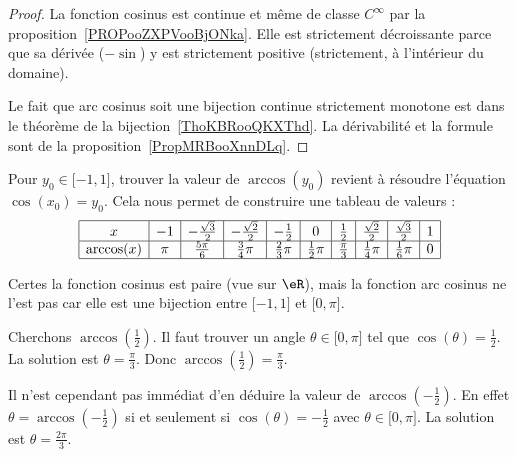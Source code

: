 \begin{proof}
	La fonction cosinus est continue et même de classe \(  C^{\infty}\) par la proposition~\ref{PROPooZXPVooBjONka}. Elle est strictement décroissante parce que sa dérivée (\( -\sin\)) y est strictement positive (strictement, à l'intérieur du domaine).

		Le fait que arc cosinus soit une bijection continue strictement monotone est dans le théorème de la bijection~\ref{ThoKBRooQKXThd}. La dérivabilité et la formule sont de la proposition~\ref{PropMRBooXnnDLq}.
	\end{proof}

	Pour \( y_0\in\mathopen[ -1 , 1 \mathclose]\), trouver la valeur de \( \arccos(y_0)\) revient à résoudre l'équation \( \cos(x_0)=y_0\). Cela nous permet de construire une tableau de valeurs :
	\begin{equation*}
		\begin{array}[]{|c|c|c|c|c|c|c|c|c|c|}
			\hline
			x          & -1  & -\frac{ \sqrt{3} }{2} & -\frac{ \sqrt{2} }{2} & -\frac{ 1 }{2}     & 0                & \frac{ 1 }{2}     & \frac{ \sqrt{2} }{2} & \frac{ \sqrt{3} }{2} & 1 \\
			\hline
			\arccos(x) & \pi & \frac{ 5\pi }{ 6 }    & \frac{ 3 }{ 4 }\pi    & \frac{ 2 }{ 3 }\pi & \frac{ 1 }{2}\pi & \frac{ \pi }{ 3 } & \frac{1}{ 4 }\pi     & \frac{1}{ 6 }\pi     & 0 \\
			\hline
		\end{array}
	\end{equation*}

	\begin{remark}
		Certes la fonction cosinus est paire (vue sur \( \eR\)), mais la fonction arc cosinus ne l'est pas car elle est une bijection entre \(\mathopen[ -1 , 1 \mathclose]\) et \(\mathopen[ 0 , \pi \mathclose]\).
	\end{remark}

	\begin{example}
		Cherchons \( \arccos(\frac{ 1 }{2})\). Il faut trouver un angle \( \theta\in\mathopen[ 0 , \pi \mathclose]\) tel que \( \cos(\theta)=\frac{ 1 }{2}\). La solution est \( \theta=\frac{ \pi }{ 3 }\). Donc \( \arccos(\frac{ 1 }{2})=\frac{ \pi }{ 3 }\).

		Il n'est cependant pas immédiat d'en déduire la valeur de \( \arccos(-\frac{ 1 }{2})\). En effet \( \theta=\arccos(-\frac{ 1 }{2})\) si et seulement si \( \cos(\theta)=-\frac{ 1 }{2}\) avec \( \theta\in\mathopen[ 0 , \pi \mathclose]\). La solution est \( \theta=\frac{ 2\pi }{ 3 }\).
	\end{example}

